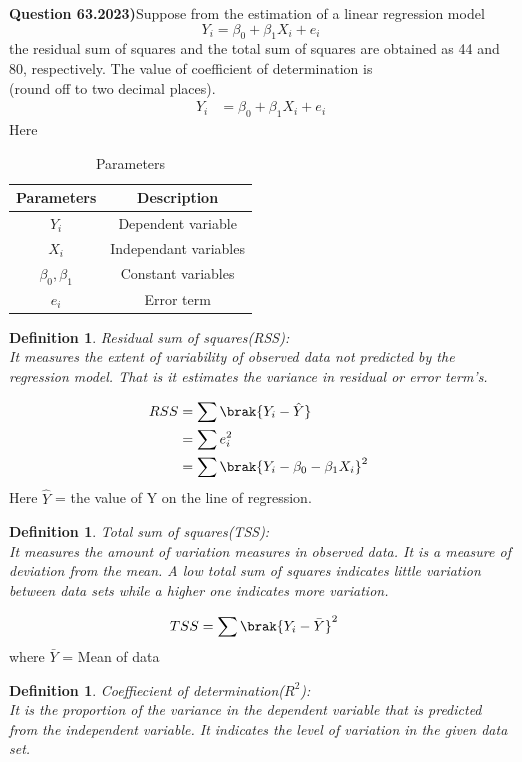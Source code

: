 \documentclass[journal,12pt,twocolumn]{IEEEtran}
\newtheorem{definition}[problem]{Definition}
\theoremstyle{remark}
\begin{document}
\textbf{Question 63.2023)}Suppose from the estimation of a linear regression model
$$Y_i=\beta_0+\beta_1X_i+e_i$$
the residual sum of squares and the total sum of squares are obtained as 44 and 80, respectively. The value of coefficient of determination is \\ (round off to two decimal places).\\
\solution
\fi
\begin{align}
Y_i &= \beta_0+\beta_1X_i+e_i
\end{align}
Here 
\begin{table}[ht]
    \centering
    \caption{Parameters}
    \label{table:xh_63.2023}
\begin{tabular}{|c|c|}
\hline
Parameters & Description \\
\hline
$Y_i$ & Dependent variable \\
\hline
$X_i$ & Independant variables \\
\hline
$\beta_0 , \beta_1$ & Constant variables \\ 
\hline
$e_i$ & Error term \\
\hline
\end{tabular} 
\end{table}
\begin{definition}
Residual sum of squares(RSS): \\
It measures the extent of variability of observed data not predicted by the regression model. That is it estimates the variance in residual or error term's. 
\end{definition}
\begin{align}
RSS &= \sum \brak{Y_i-\hat{Y}} \\
    &= \sum e_i^2 \\
    &= \sum \brak{Y_i-\beta_0-\beta_1X_i}^2\
\end{align}
Here $\hat{Y}$ = the value of Y on the line of regression.
\begin{definition}
Total sum of squares(TSS): \\
It measures the amount of variation measures in observed data. It is a measure of deviation from the mean. A low total sum of squares indicates little variation between data sets while a higher one indicates more variation. 
\end{definition}
\begin{align}
TSS &= \sum \brak{Y_i-\bar{Y}}^2
\end{align}
where $\bar{Y}$ = Mean of data
\begin{definition}
Coeffiecient of determination(\(R^2\)):\\
It is the proportion of the variance in the dependent variable that is predicted from the independent variable. It indicates the level of variation in the given data set.
\end{definition}
\end{document}
